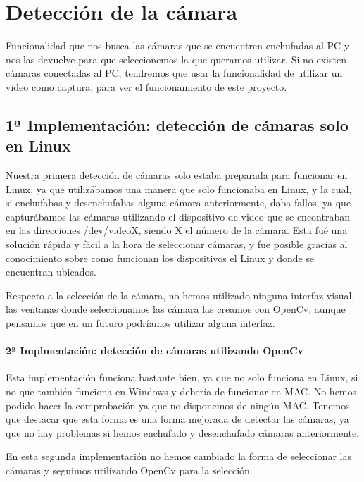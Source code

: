 \documentclass[12pt,a4paper]{report}
\begin{document}
\section{Detección de la cámara} 

Funcionalidad que nos busca las cámaras que se encuentren enchufadas al PC y nos
las devuelve para que seleccionemos la que queramos utilizar. Si no existen
cámaras conectadas al PC, tendremos que usar la funcionalidad de utilizar un
video como captura, para ver el funcionamiento de este proyecto.  

\subsection{1ª Implementación: detección de cámaras solo en Linux}

Nuestra primera detección de cámaras solo estaba preparada para funcionar en
Linux, ya que utilizábamos una manera que solo funcionaba en Linux, y la cual,
si enchufabas y desenchufabas alguna cámara anteriormente, daba fallos, ya que
capturábamos las cámaras utilizando el dispositivo de video que se encontraban
en las direcciones /dev/videoX, siendo X el número de la cámara. Esta fué una
solución rápida y fácil a la hora de seleccionar cámaras, y fue posible gracias
al conocimiento sobre como funcionan los dispositivos el Linux y donde se
encuentran ubicados. 

Respecto a la selección de la cámara, no hemos utilizado ninguna interfaz
visual, las ventanas donde seleccionamos las cámara las creamos con OpenCv,
aunque pensamos que en un futuro podríamos utilizar alguna interfaz. 

\paragraph{2ª Implmentación: detección de cámaras utilizando OpenCv}

Esta implementación funciona bastante bien, ya que no solo funciona en Linux, si
no que también funciona en Windows y debería de funcionar en MAC. No hemos
podido hacer la comprobación ya que no disponemos de ningún MAC. Tenemos que
destacar que esta forma es una forma mejorada de detectar las cámaras, ya que no
hay problemas si hemos enchufado y desenchufado cámaras anteriormente.  

En esta segunda implementación no hemos cambiado la forma de seleccionar las
cámaras y seguimos utilizando OpenCv para la selección. 



\end{document}
